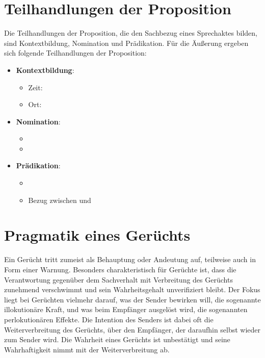 \section{Teilhandlungen der Proposition}
\label{sec:02-08_sub-actions-of-the-proposition}

Die Teilhandlungen der Proposition, die den Sachbezug eines Sprechaktes bilden, sind Kontextbildung, Nomination und Prädikation. Für die Äußerung  ergeben sich folgende Teilhandlungen der Proposition:

\begin{itemize}
    \item \textbf{Kontextbildung}:
    \begin{itemize}
        \item Zeit: 
        \item Ort: 
    \end{itemize}
    \item \textbf{Nomination}:
    \begin{itemize}
        \item {}
        \item {}
    \end{itemize}
    \item \textbf{Prädikation}:
    \begin{itemize}
        \item {}
        \item Bezug zwischen  und 
    \end{itemize}
\end{itemize}

\section{Pragmatik eines Gerüchts}
\label{sec:02-09_pragmatics-of-a-rumor}

Ein Gerücht tritt zumeist als Behauptung oder Andeutung auf, teilweise auch in Form einer Warnung. Besonders charakteristisch für Gerüchte ist, dass die Verantwortung gegenüber dem Sachverhalt mit Verbreitung des Gerüchts zunehmend verschwimmt und sein Wahrheitsgehalt unverifiziert bleibt. Der Fokus liegt bei Gerüchten vielmehr darauf, was der Sender bewirken will, die sogenannte illokutionäre Kraft, und was beim Empfänger ausgelöst wird, die sogenannten perlokutionären Effekte. Die Intention des Senders ist dabei oft die Weiterverbreitung des Gerüchts, über den Empfänger, der daraufhin selbst wieder zum Sender wird. Die Wahrheit eines Gerüchts ist unbestätigt und seine Wahrhaftigkeit nimmt mit der Weiterverbreitung ab.

